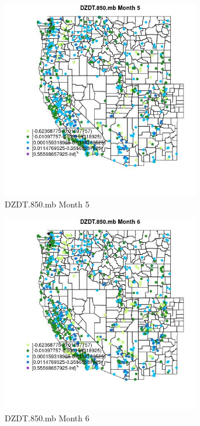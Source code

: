 \begin{figure} 
\centering  
\includegraphics[width=0.77\textwidth]{Code_Outputs/Report_ML_input_PM25_Step4_part_f_de_duplicated_aveswNAs_MapObsMo5DZDT850mb.jpg} 
\caption{\label{fig:Report_ML_input_PM25_Step4_part_f_de_duplicated_aveswNAsMapObsMo5DZDT850mb}DZDT.850.mb Month 5} 
\end{figure} 
 

\begin{figure} 
\centering  
\includegraphics[width=0.77\textwidth]{Code_Outputs/Report_ML_input_PM25_Step4_part_f_de_duplicated_aveswNAs_MapObsMo6DZDT850mb.jpg} 
\caption{\label{fig:Report_ML_input_PM25_Step4_part_f_de_duplicated_aveswNAsMapObsMo6DZDT850mb}DZDT.850.mb Month 6} 
\end{figure} 
 

